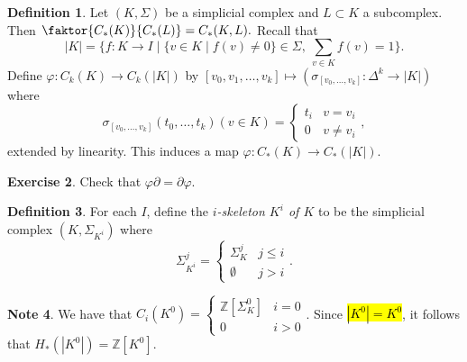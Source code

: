 \documentclass[10pt,letterpaper,cm]{nupset}
\theoremstyle{definition}
\newtheorem{definition}{Definition}[subsection]
\newtheorem{note}[definition]{Note}
\theoremstyle{theorem}
\newtheorem{exercise}[definition]{Exercise}
\theoremstyle{remark}
\newcommand{\Z}{\mathbb Z}
\newcommand{\1}{\mathbb{1}}
\newcommand{\0}{\vec 0}
\begin{document}
\begin{definition}
Let $(K, \Sigma)$ be a simplicial complex and $L \subset K$ a subcomplex. Then  $\faktor{C_{\ast}(K)}{C_{\ast}(L)} = C_{\ast}(K,L).$ Recall that $$|K|=\{f: K \to I \mid \{v\in K \mid f(v) \ne 0\} \in \Sigma, \ \sum_{v\in K}f(v) =1\} .$$ Define $\varphi : C_k(K) \to C_k(|K|)$ by $[v_0, v_1, \ldots, v_k] \mapsto (\sigma_{[v_0, \ldots, v_k]} : \Delta^k \to |K|)$ where $$\sigma_{[v_0, \ldots, v_k]}(t_0, \ldots, t_k)(v \in K) = \begin{cases} t_i & v=v_i \\ 0 & v \ne v_i \end{cases},$$ extended by linearity. This induces a map $\varphi : C_{\ast}(K) \to C_{\ast}(|K|)$.
\end{definition}

\begin{exercise}
Check that $\varphi \partial = \partial \varphi$.
\end{exercise}

\begin{definition}
For each $I$, define the \textit{$i$-skeleton $K^i$ of $K$} to be the simplicial complex $(K, \Sigma_{K^i})$ where $$\Sigma_{K^i}^j = \begin{cases} \Sigma_K^j & j \leq i \\ \emptyset & j >i \end{cases}.$$
\end{definition}

\begin{note}
We have that $C_i(K^0) = \begin{cases} \Z[\Sigma_K^0] & i =0 \\ 0 & i>0\end{cases}$. Since \hl{$|K^0| = K^0$}, it follows that $H_{\ast}(|K^0|) = \Z[K^0]$.
\end{note}
\end{document}
